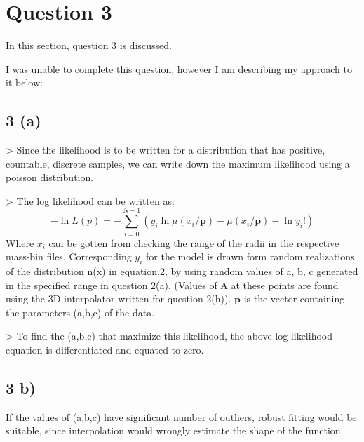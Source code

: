 \section{Question 3}

In this section, question 3 is discussed.

I was unable to complete this question, however I am describing my approach to it below:

\subsection{3 (a)}
> Since the likelihood is to be written for a distribution that has positive, countable, discrete samples, we can write down the maximum likelihood using a poisson distribution.

> The log likelihood can be written as:
 $$ -\ln{L(p)} = -\sum\limits_{i=0}^{N-1} {(y_i \ln{\mu(x_i/\mathbf{p})} - \mu(x_i/\mathbf{p})- \ln{y_i!} )} $$
Where $x_i$ can be gotten from checking the range of the radii in the respective mass-bin files. Corresponding $y_i$ for the model is drawn form random realizations of the distribution n(x) in equation.2, by using random values of a, b, c generated in the specified range in question 2(a). (Values of A at these points are found using the 3D interpolator written for question 2(h)). 
$\mathbf{p}$ is the vector containing the parameters (a,b,c) of the data.

> To find the (a,b,c) that maximize this likelihood, the above log likelihood equation is differentiated and equated to zero. 
 
 \subsection{3 b)}
If the values of (a,b,c) have significant number of outliers, robust fitting would be suitable, since interpolation would wrongly estimate the shape of the function. 
 


